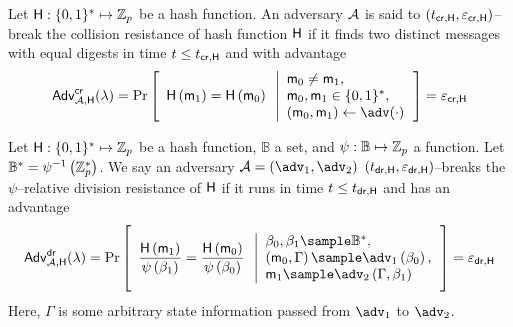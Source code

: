 \documentclass[version=submission, floatrow]{iacrcc}
\begin{document}
\begin{definition}
Let $\mathsf{H}: \{0,1\}^{\ast} \mapsto \mathbb{Z}_{p}$ be a hash function. An adversary $\mathcal{A}$ is said to $\left(t_{\mathsf{cr}, \mathsf{H}}, \varepsilon_{\mathsf{cr}, \mathsf{H}}\right)$--break the collision resistance of hash function $\mathsf{H}$ if it finds two distinct messages with equal digests in time $t \le t_{\mathsf{cr}, \mathsf{H}}$ and with advantage \begin{equation}\label{eq:collision-resistance}
    \mathsf{Adv}_{\Attacker, \HashFunctionH}^{\mathsf{cr}}(\lambda) = 
    \Probability{\begin{array}{ll}
    \\
    \HashH{\msg{1}} = \HashH{\msg{0}}\\
    \\
    \end{array}
    \left|
    \begin{array}{ll}
    \msg{0} \neq \msg{1},\\
    \msg{0}, \msg{1} \in \{0,1\}^{\ast},\\
    (\msg{0}, \msg{1}) \leftarrow \adv(\cdot)
    \end{array}\right.} = \varepsilon_{\mathsf{cr}, \HashFunctionH}
\end{equation}
\end{definition}

\begin{definition}
Let $\mathsf{H}: \{0,1\}^{\ast} \mapsto \mathbb{Z}_{p}$ be a hash function, $\mathbb{B}$ a set, and $\psi: \mathbb{B} \mapsto \mathbb{Z}_{p}$ a function. Let $\mathbb{B}^{\ast} = \psi^{-1}\left(\mathbb{Z}_{p}^{\ast}\right)$. We say an adversary $\Attacker = \left(\adv_{1}, \adv_{2}\right)$ $\left(t_{\mathsf{dr}, \mathsf{H}}, \varepsilon_{\mathsf{dr}, \mathsf{H}}\right)$--breaks the $\psi$--relative division resistance of $\mathsf{H}$ if it runs in time $t \le t_{\mathsf{dr}, \mathsf{H}}$ and has an advantage \begin{equation}\label{eq:psi-resistance-division-resistance}
    \mathsf{Adv}_{\Attacker, \HashFunctionH}^{\mathsf{dr}}(\lambda) = 
    \Probability{
    \begin{array}{ll}
    \\
    \dfrac{\HashH{\msg{1}}}{\psi\left(\beta_{1}\right)} = \dfrac{\HashH{\msg{0}}}{\psi\left(\beta_{0}\right)} \\
    \\
    \end{array}
    \left|
    \begin{array}{ll}
    \beta_{0}, \beta_{1} \sample \mathbb{B}^{\ast},\\
    \left(\msg{0}, \Gamma\right) \sample \adv_{1}\left(\beta_{0}\right),\\
    \msg{1} \sample \adv_{2}\left(\Gamma, \beta_{1}\right)
    \end{array}\right.
    } = \varepsilon_{\mathsf{dr}, \HashFunctionH}
\end{equation}
Here, $\Gamma$ is some arbitrary state information passed from $\adv_{1}$ to $\adv_{2}$.
\end{definition}
\end{document}
